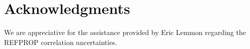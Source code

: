 \documentclass[journal=jctc,manuscript=article]{achemso}
\begin{document}
%
%
%


\section*{Acknowledgments}

We are appreciative for the assistance provided by Eric Lemmon regarding the REFPROP correlation uncertainties.



\end{document}
